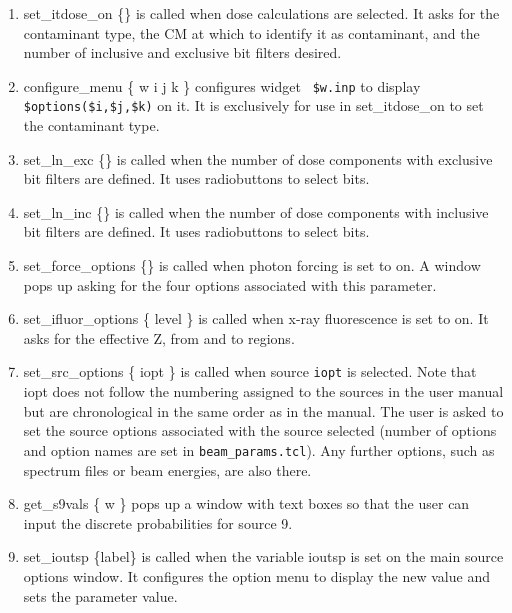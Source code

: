 \documentclass[12pt]{book}
\begin{document}
\begin{enumerate}
\begin{enumerate}
{\tt values(28,3,\$i)} to {\tt \$label} and configures {\tt \$w.inp} to display
it.  This value is the zone type
and is called from {\sf set\_scoring\_options}.
\item {\sf set\_itdose\_on \{\}} is called when dose calculations are
selected.  It asks for the contaminant type, the CM at which to identify
it as contaminant, and the number of inclusive and exclusive bit filters
desired.
\item {\sf configure\_menu \{ w i j k \}} configures widget {\tt
\$w.inp} to display
{\tt \$options(\$i,\$j,\$k)} on it.  It is exclusively for use in
set\_itdose\_on to set the contaminant type.
\item {\sf set\_ln\_exc \{\}} is called when the number of dose components
with exclusive bit filters are defined.  It uses radiobuttons to select bits.
\item {\sf set\_ln\_inc \{\}} is called when the number of dose components
with inclusive bit filters are defined.  It uses radiobuttons to select bits.
\item {\sf set\_force\_options \{\}} is called when photon forcing is set to
on.  A window pops up asking for the four options associated with this
parameter.
\item {\sf set\_ifluor\_options \{ level \}} is called when x-ray fluorescence
is set to on.  It asks for the effective Z, from and to regions.
\item {\sf set\_src\_options \{ iopt \}} is called when source {\tt iopt} is
selected.  Note that iopt does not follow the numbering assigned to the
sources in the user manual but are chronological in the same order as in
the manual.  The user is asked to set the source options associated with
the source selected (number of options and option names are set in
{\tt beam\_params.tcl}).  Any further options, such as spectrum files
or beam energies, are also there.
\item {\sf get\_s9vals \{ w \}} pops up a window with text boxes so that the
user can input the discrete probabilities for source 9.
\item {\sf set\_ioutsp \{label\}} is called when the variable ioutsp is set on
the main source options window.  It configures the option menu to
display the new value and sets the parameter value.
\end{enumerate}


\end{enumerate}
\end{document}
